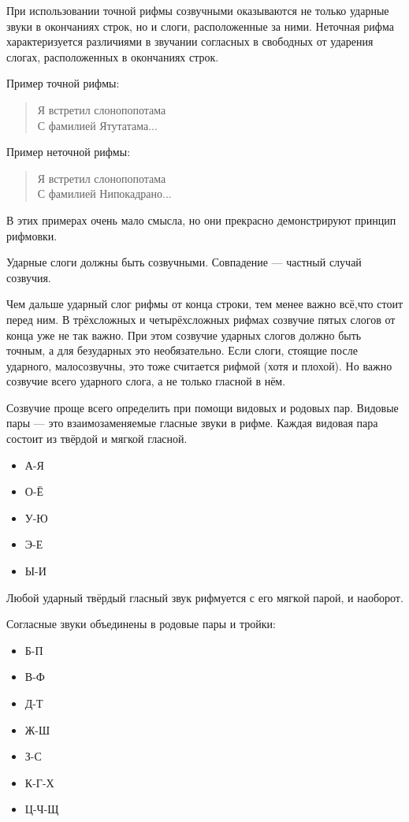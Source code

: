 При использовании точной рифмы созвучными оказываются не только ударные звуки в окончаниях строк, но и слоги, расположенные за ними. Неточная рифма характеризуется различиями в звучании согласных в свободных от ударения слогах, расположенных в окончаниях строк.

Пример точной рифмы:

\begin{verse}
Я встретил слонопопотама\\
С фамилией Ятутатама...
\end{verse}

Пример неточной рифмы:

\begin{verse}
Я встретил слонопопотама\\
С фамилией Нипокадрано...
\end{verse}

В этих примерах очень мало смысла, но они прекрасно демонстрируют принцип рифмовки.

Ударные слоги должны быть созвучными. Совпадение --- частный случай созвучия.

Чем дальше ударный слог рифмы от конца строки, тем менее важно всё,что стоит перед ним. В трёхсложных и четырёхсложных рифмах созвучие пятых слогов от конца уже не так важно. При этом созвучие ударных слогов должно быть точным, а для безударных это необязательно.  Если слоги, стоящие после ударного, малосозвучны, это тоже считается рифмой (хотя и плохой). Но важно созвучие всего ударного слога, а не только гласной в нём.

Созвучие проще всего определить при помощи видовых и родовых пар. Видовые пары --- это взаимозаменяемые гласные звуки в рифме. Каждая видовая пара состоит из твёрдой и мягкой гласной.
\begin{itemize}
\item А-Я
\item О-Ё
\item У-Ю
\item Э-Е
\item Ы-И
\end{itemize}

Любой ударный твёрдый гласный  звук рифмуется с его мягкой парой, и наоборот.

Согласные звуки объединены в родовые пары и тройки:

\begin{itemize}
\item Б-П
\item В-Ф
\item Д-Т
\item Ж-Ш
\item З-С
\item К-Г-Х
\item Ц-Ч-Щ
\end{itemize}

